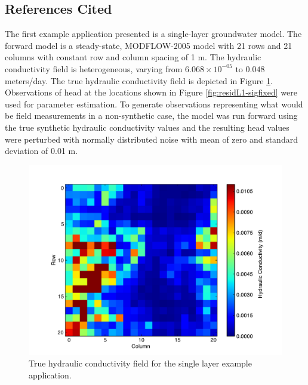 \documentclass[11pt,oneside,onecolumn]{usgsreport}
\begin{document}
\begin{appendix}
\begin{bibunit}
\subsection{References Cited}
\putbib[GW]
\end{bibunit}
\begin{bibunit}

The first example application presented is a single-layer groundwater
model. The forward model is a steady-state, MODFLOW-2005 model with
21 rows and 21 columns with constant row and column spacing of 1 m.
The hydraulic conductivity field is heterogeneous, varying from $6.068\times10^{-05}$
to $0.048$ meters/day. The true hydraulic conductivity field is depicted
in Figure \ref{fig:trueK1L}. Observations of head at the locations
shown in Figure \ref{fig:residL1-sigfixed} were used for parameter
estimation. To generate observations representing what would be field
measurements in a non-synthetic case, the model was run forward using
the true synthetic hydraulic conductivity values and the resulting
head values were perturbed with normally distributed noise with mean
of zero and standard deviation of 0.01 m.

\begin{figure}[!t]
\begin{center}\includegraphics[scale=0.4]{figures/TrueK}\end{center}

\caption{True hydraulic conductivity field for the single layer example application.\label{fig:trueK1L}}



\end{figure}
\end{bibunit}
\end{appendix}
\end{document}
